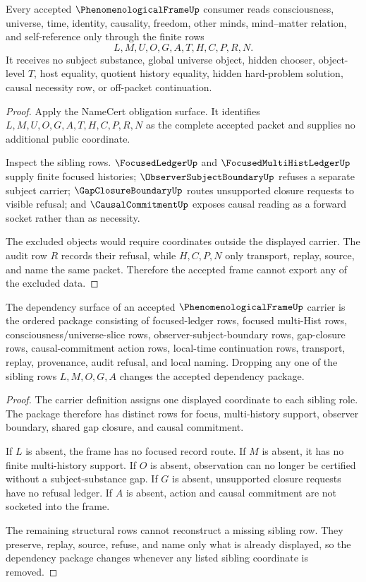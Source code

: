 \begin{theorem}
\label{thm:phenomenological-frame-audit-nonescape}
Every accepted $\PhenomenologicalFrameUp$ consumer reads consciousness, universe, time, identity, causality, freedom, other minds, mind--matter relation, and self-reference only through the finite rows
$$
L,M,U,O,G,A,T,H,C,P,R,N.
$$
It receives no subject substance, global universe object, hidden chooser, object-level $T$, host equality, quotient history equality, hidden hard-problem solution, causal necessity row, or off-packet continuation.
\end{theorem}
\begin{proof}
Apply the NameCert obligation surface. It identifies $L,M,U,O,G,A,T,H,C,P,R,N$ as the complete accepted packet and supplies no additional public coordinate.

Inspect the sibling rows. $\FocusedLedgerUp$ and $\FocusedMultiHistLedgerUp$ supply finite focused histories; $\ObserverSubjectBoundaryUp$ refuses a separate subject carrier; $\GapClosureBoundaryUp$ routes unsupported closure requests to visible refusal; and $\CausalCommitmentUp$ exposes causal reading as a forward socket rather than as necessity.

The excluded objects would require coordinates outside the displayed carrier. The audit row $R$ records their refusal, while $H,C,P,N$ only transport, replay, source, and name the same packet. Therefore the accepted frame cannot export any of the excluded data.
\end{proof}

\begin{theorem}
\label{thm:phenomenological-frame-dependency-package}
The dependency surface of an accepted $\PhenomenologicalFrameUp$ carrier is the ordered package consisting of focused-ledger rows, focused multi-Hist rows, consciousness/universe-slice rows, observer-subject-boundary rows, gap-closure rows, causal-commitment action rows, local-time continuation rows, transport, replay, provenance, audit refusal, and local naming. Dropping any one of the sibling rows $L,M,O,G,A$ changes the accepted dependency package.
\end{theorem}
\begin{proof}
The carrier definition assigns one displayed coordinate to each sibling role. The package therefore has distinct rows for focus, multi-history support, observer boundary, shared gap closure, and causal commitment.

If $L$ is absent, the frame has no focused record route. If $M$ is absent, it has no finite multi-history support. If $O$ is absent, observation can no longer be certified without a subject-substance gap. If $G$ is absent, unsupported closure requests have no refusal ledger. If $A$ is absent, action and causal commitment are not socketed into the frame.

The remaining structural rows cannot reconstruct a missing sibling row. They preserve, replay, source, refuse, and name only what is already displayed, so the dependency package changes whenever any listed sibling coordinate is removed.
\end{proof}

